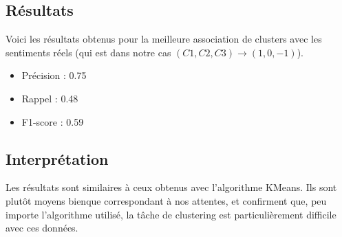 \documentclass{article}
\begin{document}
\subsection*{Résultats}

Voici les résultats obtenus pour la meilleure association de clusters
avec les sentiments réels 
(qui est dans notre cas $(C1, C2, C3) \rightarrow (1, 0, -1)$).

\begin{itemize}
    \item Précision : 0.75
    \item Rappel : 0.48
    \item F1-score : 0.59
\end{itemize}

\subsection*{Interprétation}

Les résultats sont similaires à ceux obtenus avec l'algorithme KMeans. Ils sont plutôt moyens bienque
correspondant à nos attentes, et confirment que, peu importe l'algorithme utilisé, 
la tâche de clustering est particulièrement difficile avec ces données. 
\end{document}
